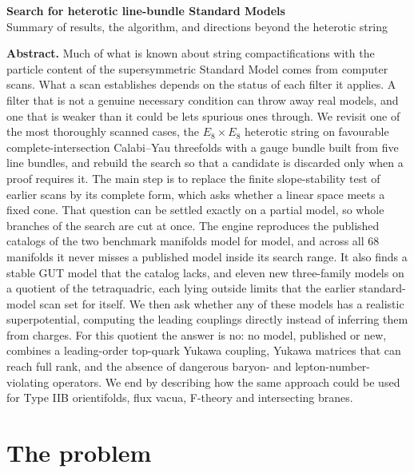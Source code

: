 \documentclass[10pt,a4paper]{article}
\begin{document}
\begin{center}
{\large\bfseries Search for heterotic line-bundle Standard Models}\\[3pt]
{\normalsize Summary of results, the algorithm, and directions beyond the heterotic string}\\[4pt]
{}
\end{center}

\vspace{-2pt}
{\small\noindent\textbf{Abstract.}
Much of what is known about string compactifications with the particle content
of the supersymmetric Standard Model comes from computer scans. What a scan
establishes depends on the status of each filter it applies. A filter that is
not a genuine necessary condition can throw away real models, and one that is
weaker than it could be lets spurious ones through. We revisit one of the most
thoroughly scanned cases, the $E_8\times E_8$ heterotic string on favourable
complete-intersection Calabi--Yau threefolds with a gauge bundle built from five
line bundles, and rebuild the search so that a candidate is discarded only when
a proof requires it. The main step is to replace the finite slope-stability test
of earlier scans by its complete form, which asks whether a linear space meets
a fixed cone. That question can be settled exactly on a partial model, so whole
branches of the search are cut at once. The engine reproduces the published
catalogs of the two benchmark manifolds model for model, and across all 68
manifolds it never misses a published model inside its search range. It also
finds a stable GUT model that the catalog lacks, and eleven new three-family
models on a quotient of the tetraquadric, each lying outside limits that the
earlier standard-model scan set for itself. We then ask whether any of these
models has a realistic superpotential, computing the leading couplings directly
instead of inferring them from charges. For this quotient the answer is no: no
model, published or new, combines a leading-order top-quark Yukawa coupling,
Yukawa matrices that can reach full rank, and the absence of dangerous baryon-
and lepton-number-violating operators. We end by describing how the same
approach could be used for Type IIB orientifolds, flux vacua, F-theory and
intersecting branes.\par}

\section{The problem}
\end{document}
